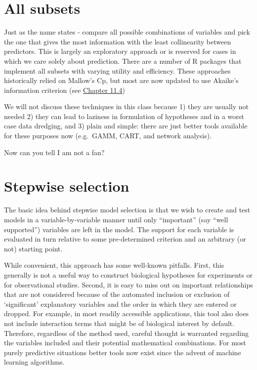 \documentclass[
]{book}
\begin{document}
\hypertarget{all-subsets}{%
\section{All subsets}\label{all-subsets}}

Just as the name states - compare all possible combinations of variables and pick the one that gives the most information with the least collinearity between predictors. This is largely an exploratory approach or is reserved for cases in which we care solely about prediction. There are a number of R packages that implement all subsets with varying utility and efficiency. These approaches historically relied on Mallow's Cp, but most are now updated to use Akaike's information criterion (see \protect\hyperlink{a-priori}{Chapter 11.4})

We will not discuss these techniques in this class because 1) they are usually not needed 2) they can lead to laziness in formulation of hypotheses and in a worst case data dredging, and 3) plain and simple: there are just better tools available for these purposes now (e.g.~GAMM, CART, and network analysis).

Now can you tell I am not a fan?

\hypertarget{stepwise}{%
\section{Stepwise selection}\label{stepwise}}

The basic idea behind stepwise model selection is that we wish to create and test models in a variable-by-variable manner until only ``important'' (say ``well supported'') variables are left in the model. The support for each variable is evaluated in turn relative to some pre-determined criterion and an arbitrary (or not) starting point.

While convenient, this approach has some well-known pitfalls. First, this generally is not a useful way to construct biological hypotheses for experiments or for observational studies. Second, it is easy to miss out on important relationships that are not considered because of the automated inclusion or exclusion of `significant' explanatory variables and the order in which they are entered or dropped. For example, in most readily accessible applications, this tool also does not include interaction terms that might be of biological interest by default. Therefore, regardless of the method used, careful thought is warranted regarding the variables included and their potential mathematical combinations. For most purely predictive situations better tools now exist since the advent of machine learning algorithms.
\end{document}
